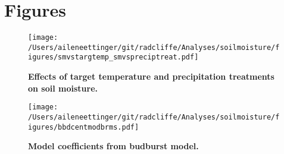 \documentclass{article}
\begin{document}



\begin{singlespace}


\end{singlespace}

\clearpage
\section* {Figures}
\clearpage
 \begin{figure}[h]
\centering
 \texttt{[image: /Users/aileneettinger/git/radcliffe/Analyses/soilmoisture/figures/smvstargtemp\_smvspreciptreat.pdf]}
 \caption{\textbf{Effects of target temperature and precipitation treatments on soil moisture.}} 
 \label{fig:soilmois}
 \end{figure}

\begin{figure}[h]
\centering
 \texttt{[image: /Users/aileneettinger/git/radcliffe/Analyses/soilmoisture/figures/bbdcentmodbrms.pdf]}
 \caption{\textbf{Model coefficients from budburst model.}} 
 \label{fig:bb}
 \end{figure}

\end{document}
